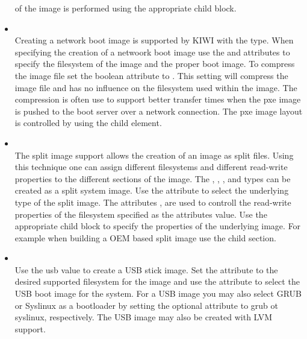 \begin{itemize}
      of the image is performed using the appropriate  child
      block.
\item {}\\
      Creating a network boot image is supported by KIWI with the 
       type. When specifying the creation of a netwoork boot image use the
       and  attributes 
      to specify the filesystem of the image and the proper boot image. To
      compress the image file set the  boolean attribute
      to . This setting will compress the image file and has no influence
      on the filesystem used within the image. The compression is often use to
      support better transfer times when the pxe image is pushed to the 
      boot server over a network connection. The pxe image layout is
      controlled by using the  child element.
\item {}\\
      The split image support allows the creation of an image as split
      files. Using this technique one can assign different filesystems and
      different read-write properties to the different sections of the image.
      The , , , and  
      types can be created as a split system image. Use the 
       attribute
      to select the underlying type of the split image. The attributes
      ,  are used to controll the
      read-write properties of the filesystem specified as the attributes
      value. Use the appropriate  child block to specify
      the properties of the underlying image. For example when building a 
      OEM based split image use the  child section.
\item {}\\
      Use the usb value to create a USB stick image. Set the
       attribute to the desired supported filesystem for
      the image and use the  attribute to
      select the USB boot image for the system. For a USB image you may
      also select GRUB or Syslinux as a bootloader by setting the
      optional  attribute to grub ot syslinux,
      respectively. The USB image may also be created with LVM support.

\end{itemize}
